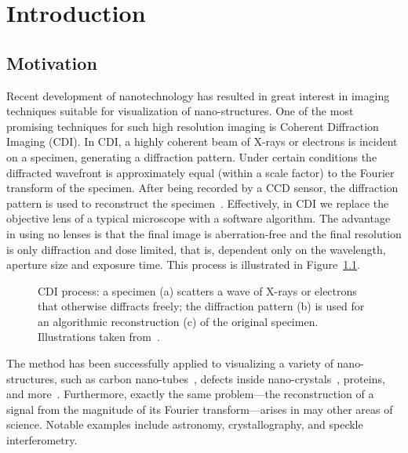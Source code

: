 

\chapter{Introduction}
\label{cha:introduction}

\section{Motivation}
\label{sec:motivation}
Recent development of nanotechnology has resulted in great interest in
imaging techniques suitable for visualization of nano-structures.  One
of the most promising techniques for such high resolution imaging is
Coherent Diffraction Imaging (CDI). In CDI, a highly coherent beam of
X-rays or electrons is incident on a specimen, generating a
diffraction pattern.  Under certain conditions the diffracted
wavefront is approximately equal (within a scale factor) to the
Fourier transform of the specimen.  After being recorded by a CCD
sensor, the diffraction pattern is used to reconstruct the
specimen~.
Effectively, in CDI we replace the objective lens of a typical
microscope with a software algorithm. The advantage in using no lenses
is that the final image is aberration-free and the final resolution is
only diffraction and dose limited, that is, dependent only on the
wavelength, aperture size and exposure time. This process is
illustrated in Figure~\ref{fig:cdi-process}.
\begin{figure}[H]
  \centering
  \caption[CDI process]{CDI process: a specimen (a) scatters a wave of
    X-rays or electrons that otherwise diffracts freely; the
    diffraction pattern (b) is used for an algorithmic reconstruction
    (c) of the original specimen. Illustrations taken
    from~.}
  \label{fig:cdi-process}
\end{figure}
The method has been successfully applied to visualizing a variety of
nano-structures, such as carbon nano-tubes~,
defects inside nano-crystals~,
proteins, and
more~.
Furthermore, exactly the same problem---the reconstruction of a signal
from the magnitude of its Fourier transform---arises in may other
areas of science. Notable examples include astronomy, crystallography,
and speckle interferometry.

